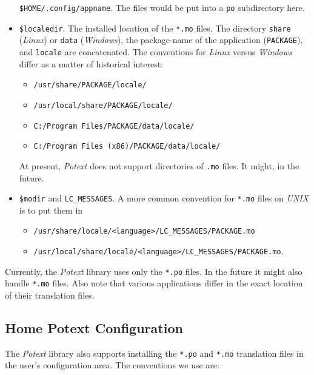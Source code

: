 \documentclass[
 11pt,
 twoside,
 a4paper,
 final                                 %
]{article}
\begin{document}
\begin{itemize}
         \texttt{\$HOME/.config/appname}.
         The files would be put into a \texttt{po} subdirectory here.
      \item \texttt{\$localedir}. The installed
         location of the \texttt{*.mo} files.
         The directory \texttt{share} (\textsl{Linux})
         or \texttt{data} (\textsl{Windows}),
         the package-name of the application
         (\texttt{PACKAGE}), and \texttt{locale} are concatenated.
         The conventions for \textsl{Linux} versus \textsl{Windows}
         differ as a matter of historical interest:
         \begin{itemize}
            \item \texttt{/usr/share/PACKAGE/locale/}
            \item \texttt{/usr/local/share/PACKAGE/locale/}
            \item \texttt{C:/Program Files/PACKAGE/data/locale/}
            \item \texttt{C:/Program Files (x86)/PACKAGE/data/locale/}
         \end{itemize}
            At present, \textsl{Potext} does not support directories of
            \texttt{.mo} files. It might, in the future.
      \item \texttt{\$modir} and \texttt{LC\_MESSAGES}.
            A more common convention for
            \texttt{*.mo} files on \textsl{UNIX} is to put them in
         \begin{itemize}
            \item \texttt{/usr/share/locale/<language>/LC\_MESSAGES/PACKAGE.mo}
            \item \texttt{/usr/local/share/locale/<language>/LC\_MESSAGES/PACKAGE.mo}.
         \end{itemize}
   \end{itemize}

   Currently, the \textsl{Potext} library uses only the \texttt{*.po} files.
   In the future it might also handle \texttt{*.mo} files.
   Also note that various applications differ in the exact location of their
   translation files.

\subsection{Home Potext Configuration}
\label{subsec:introduction_home_potext_configuration}

   The \textsl{Potext} library also supports installing the
   \texttt{*.po} and \texttt{*.mo} translation files in the
   user's configuration area.
   The conventions we use are:
\end{document}
